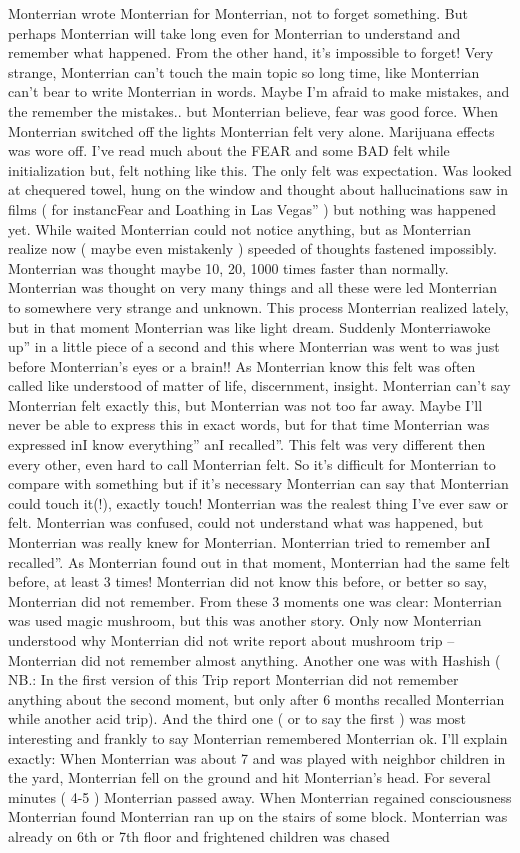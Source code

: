 \documentclass[12pt]{book}
\begin{document}
Monterrian wrote Monterrian for Monterrian, not to forget something. But perhaps Monterrian will take long even for Monterrian to understand and remember what happened. From the other hand, it's impossible to forget! Very strange, Monterrian can't touch the main topic so long time, like Monterrian can't bear to write Monterrian in words. Maybe I'm afraid to make mistakes, and the remember the mistakes.. but Monterrian believe, fear was good force. When Monterrian switched off the lights Monterrian felt very alone. Marijuana effects was wore off. I've read much about the FEAR and some BAD felt while initialization but, felt nothing like this. The only felt was expectation. Was looked at chequered towel, hung on the window and thought about hallucinations saw in films ( for instancFear and Loathing in Las Vegas'' ) but nothing was happened yet. While waited Monterrian could not notice anything, but as Monterrian realize now ( maybe even mistakenly ) speeded of thoughts fastened impossibly. Monterrian was thought maybe 10, 20, 1000 times faster than normally. Monterrian was thought on very many things and all these were led Monterrian to somewhere very strange and unknown. This process Monterrian realized lately, but in that moment Monterrian was like light dream. Suddenly Monterriawoke up'' in a little piece of a second and this where Monterrian was went to was just before Monterrian's eyes or a brain!! As Monterrian know this felt was often called like understood of matter of life, discernment, insight. Monterrian can't say Monterrian felt exactly this, but Monterrian was not too far away. Maybe I'll never be able to express this in exact words, but for that time Monterrian was expressed inI know everything'' anI recalled''. This felt was very different then every other, even hard to call Monterrian felt. So it's difficult for Monterrian to compare with something but if it's necessary Monterrian can say that Monterrian could touch it(!), exactly touch! Monterrian was the realest thing I've ever saw or felt. Monterrian was confused, could not understand what was happened, but Monterrian was really knew for Monterrian. Monterrian tried to remember anI recalled''. As Monterrian found out in that moment, Monterrian had the same felt before, at least 3 times! Monterrian did not know this before, or better so say, Monterrian did not remember. From these 3 moments one was clear: Monterrian was used magic mushroom, but this was another story. Only now Monterrian understood why Monterrian did not write report about mushroom trip -- Monterrian did not remember almost anything. Another one was with Hashish ( NB.: In the first version of this Trip report Monterrian did not remember anything about the second moment, but only after 6 months recalled Monterrian while another acid trip). And the third one ( or to say the first ) was most interesting and frankly to say Monterrian remembered Monterrian ok. I'll explain exactly: When Monterrian was about 7 and was played with neighbor children in the yard, Monterrian fell on the ground and hit Monterrian's head. For several minutes ( 4-5 ) Monterrian passed away. When Monterrian regained consciousness Monterrian found Monterrian ran up on the stairs of some block. Monterrian was already on 6th or 7th floor and frightened children was chased 
\end{document}
